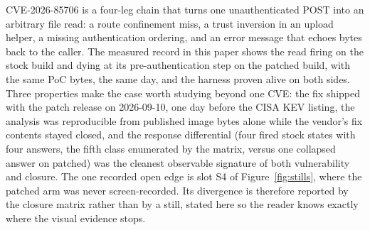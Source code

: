 \documentclass[journal]{IEEEtran}
\begin{document}
CVE-2026-85706 is a four-leg chain that turns one unauthenticated POST into
an arbitrary file read: a route confinement miss, a trust inversion in an
upload helper, a missing authentication ordering, and an error message that
echoes bytes back to the caller. The measured record in this paper shows the
read firing on the stock build and dying at its pre-authentication step on the
patched build, with the same PoC bytes, the same day, and the harness proven
alive on both sides. Three properties make the case worth studying beyond one
CVE: the fix shipped with the patch release on 2026-09-10, one day before the
CISA KEV listing, the analysis was reproducible from published image bytes
alone while the vendor's fix contents stayed closed, and the response
differential (four fired stock states with four answers, the fifth class
enumerated by the matrix, versus one collapsed answer on patched) was the
cleanest observable signature of both vulnerability and closure. The one
recorded open edge is slot S4 of Figure~\ref{fig:stills}, where the patched
arm was never screen-recorded. Its divergence is therefore reported by the
closure matrix rather than by a still, stated here so the reader knows exactly
where the visual evidence stops.
\end{document}
